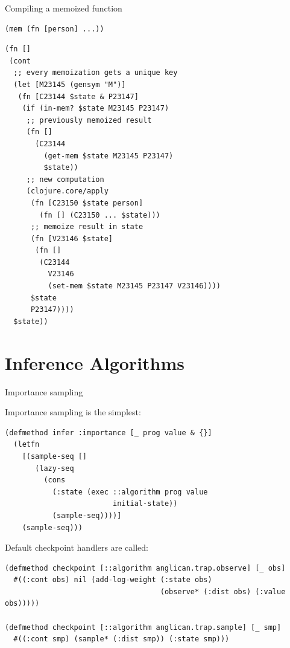 \documentclass{beamer}
\begin{document}
\begin{frame}[fragile]{Compiling a memoized function}
    \vspace{-2em}
    \begin{minipage}{0.38\textwidth}
\begin{verbatim}
(mem (fn [person] ...))
\end{verbatim}
    \end{minipage}
    \begin{minipage}{0.52\textwidth}
    \vspace{2em}
\begin{verbatim}
(fn []
 (cont
  ;; every memoization gets a unique key  
  (let [M23145 (gensym "M")]
   (fn [C23144 $state & P23147]
    (if (in-mem? $state M23145 P23147)
     ;; previously memoized result
     (fn []
       (C23144
         (get-mem $state M23145 P23147)
         $state))
     ;; new computation
     (clojure.core/apply
      (fn [C23150 $state person]
        (fn [] (C23150 ... $state)))
      ;; memoize result in state
      (fn [V23146 $state]
       (fn []
        (C23144
          V23146
          (set-mem $state M23145 P23147 V23146))))
      $state
      P23147))))
  $state))
\end{verbatim}
    \end{minipage}
\end{frame}

\section{Inference Algorithms}

\begin{frame}[fragile]{Importance sampling}

Importance sampling is the simplest:
\begin{verbatim}
(defmethod infer :importance [_ prog value & {}]
  (letfn
    [(sample-seq []
       (lazy-seq
         (cons
           (:state (exec ::algorithm prog value
                         initial-state))
           (sample-seq))))]
    (sample-seq)))
\end{verbatim}
Default checkpoint handlers are called:
\begin{verbatim}
(defmethod checkpoint [::algorithm anglican.trap.observe] [_ obs]
  #((:cont obs) nil (add-log-weight (:state obs)
                                    (observe* (:dist obs) (:value obs)))))

(defmethod checkpoint [::algorithm anglican.trap.sample] [_ smp]
  #((:cont smp) (sample* (:dist smp)) (:state smp)))
\end{verbatim}
\end{frame}
\end{document}
